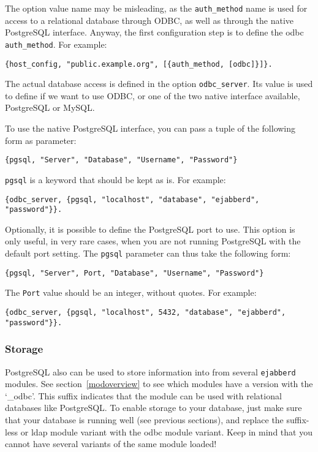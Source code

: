 \documentclass[a4paper,10pt]{article}
\newcommand{\ind}[1]{\begin{latexonly}\index{#1}\end{latexonly}}
\newcommand{\term}[1]{\texttt{#1}}
\newcommand{\ejabberd}{\texttt{ejabberd}}
\begin{document}
The option value name may be misleading, as the \term{auth\_method} name is used
for access to a relational database through ODBC, as well as through the native
PostgreSQL interface. Anyway, the first configuration step is to define the odbc
\term{auth\_method}. For example:
\begin{verbatim}
{host_config, "public.example.org", [{auth_method, [odbc]}]}.
\end{verbatim}

The actual database access is defined in the option \term{odbc\_server}. Its
value is used to define if we want to use ODBC, or one of the two native
interface available, PostgreSQL or MySQL.

To use the native PostgreSQL interface, you can pass a tuple of the following
form as parameter:
\begin{verbatim}
{pgsql, "Server", "Database", "Username", "Password"}
\end{verbatim}

\term{pgsql} is a keyword that should be kept as is. For example:
\begin{verbatim}
{odbc_server, {pgsql, "localhost", "database", "ejabberd", "password"}}.
\end{verbatim}

Optionally, it is possible to define the PostgreSQL port to use. This
option is only useful, in very rare cases, when you are not running
PostgreSQL with the default port setting. The \term{pgsql} parameter
can thus take the following form:
\begin{verbatim}
{pgsql, "Server", Port, "Database", "Username", "Password"}
\end{verbatim}

The \term{Port} value should be an integer, without quotes. For example:
\begin{verbatim}
{odbc_server, {pgsql, "localhost", 5432, "database", "ejabberd", "password"}}.
\end{verbatim}

\subsubsection{Storage}
\label{pgsqlstorage}
\ind{PostgreSQL!storage}

PostgreSQL also can be used to store information into from several \ejabberd{}
modules. See section~\ref{modoverview} to see which modules have a version
with the `\_odbc'. This suffix indicates that the module can be used with
relational databases like PostgreSQL. To enable storage to your database, just
make sure that your database is running well (see previous sections), and
replace the suffix-less or ldap module variant with the odbc module variant.
Keep in mind that you cannot have several variants of the same module loaded!
\end{document}
